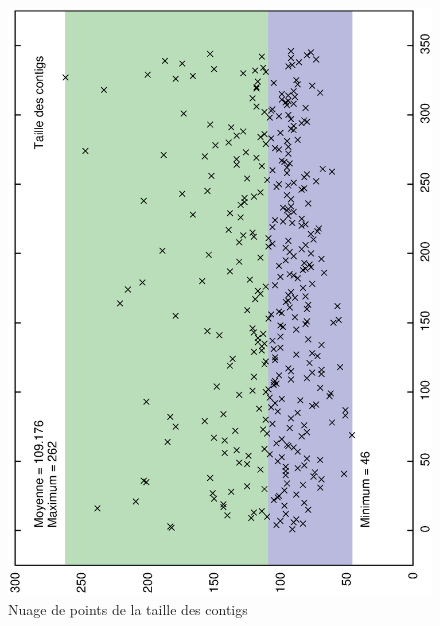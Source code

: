 \documentclass[10.9pt]{article} %
\begin{document}
\begin{figure}[p]
\centering
\includegraphics[scale=0.6,angle=270]{contigs_taille.eps}
\caption{Nuage de points de la taille des contigs}

\end{figure}
\end{document}
